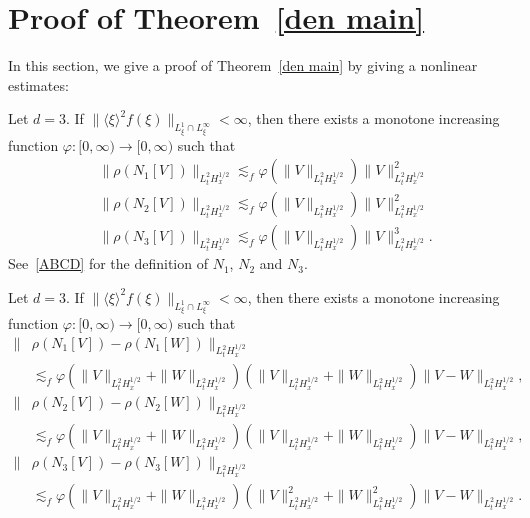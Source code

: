 \documentclass[AHL,Unicode,longabstracts,MathTools,published]{cedram}
\newcommand{\ph}{\varphi}
\newcommand{\rh}{\rho}
\newcommand{\K}[1]{\left(#1\right)}
\newcommand{\I}{\infty}
\newcommand{\lxr}{\langle \xi \rangle}
\newcommand{\ls}{\lesssim}
\begin{document}
\section{Proof of Theorem~\ref{den main}}\label{sect5}

In this section, we give a proof of Theorem~\ref{den main} by giving a nonlinear estimates:

\begin{lemm} \label{Lem}
Let $d=3$. If $\|\lxr^2 f(\xi)\|_{L^1_\xi \cap L^\I_\xi} < \I$, then there exists a monotone increasing function $\ph:[0,\I) \to [0,\I)$ such that
\begin{align}
&\| \rh(N_1[V]) \|_{L^2_t H^{1/2}_x}
\ls_f \ph\left(\|V\|_{L^2_t H^{1/2}_x}\right)
\|V\|_{L^2_t H^{1/2}_x}^2 \label{BB}
\\
&\| \rh(N_2[V]) \|_{L^2_t H^{1/2}_x}
\ls_f
\ph\left(\|V\|_{L^2_t H^{1/2}_x}\right)
\|V\|_{L^2_t H^{1/2}_x}^2 \label{CC}
\\
&\| \rh(N_3[V]) \|_{L^2_t H^{1/2}_x}
\ls_f
\ph\left(\|V\|_{L^2_t H^{1/2}_x}\right)
\|V\|_{L^2_t H^{1/2}_x}^3. \label{DD}
\end{align}
See~\eqref{ABCD} for the definition of $N_1$, $N_2$ and $N_3$.
\end{lemm}

\begin{lemm} \label{LemB}
Let $d=3$. If $\|\lxr^2 f(\xi)\|_{L^1_\xi \cap L^\I_\xi} < \I$, then there exists a monotone increasing function $\ph:[0,\I) \to [0,\I)$ such that
\begin{align}
\big\| &\rh(N_1[V]) - \rh(N_1[W]) \big\|_{L^2_t H^{1/2}_x}\label{diff BB} \\
&\ls_f
\ph\left(\|V\|_{L^2_t H^{1/2}_x}+\|W\|_{L^2_t H^{1/2}_x}\right)
\K{\|V\|_{L^2_t H^{1/2}_x} + \|W\|_{L^2_t H^{1/2}_x}}
\|V-W\|_{L^2_t H^{1/2}_x},\nonumber
\\
\big\| &\rh(N_2[V]) - \rh(N_2[W])\big\|_{L^2_t H^{1/2}_x}\label{diff CC} \\
&\ls_f
\ph\left(\|V\|_{L^2_t H^{1/2}_x}+\|W\|_{L^2_t H^{1/2}_x}\right)
\K{\|V\|_{L^2_t H^{1/2}_x}+\|W\|_{L^2_t H^{1/2}_x}}
\|V-W\|_{L^2_t H^{1/2}_x},\nonumber
\\
\big\| &\rh(N_3[V]) - \rh(N_3[W]) \big\|_{L^2_t H^{1/2}_x} \label{diff DD}\\
&\ls_f
\ph\left(\|V\|_{L^2_t H^{1/2}_x}+\|W\|_{L^2_t H^{1/2}_x}\right)
\K{\|V\|_{L^2_t H^{1/2}_x}^2+\|W\|_{L^2_t H^{1/2}_x}^2}
\|V-W\|_{L^2_t H^{1/2}_x}. \nonumber
\end{align}
\end{lemm}
\end{document}
